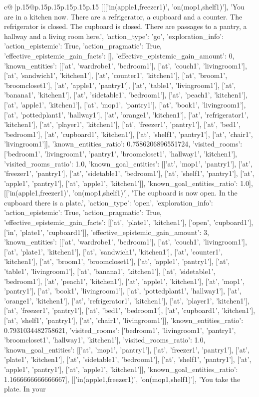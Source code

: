 \documentclass{article}
\begin{document}
{\begin{supertabular}{c@{$\;$}|p{.15\linewidth}@{}p{.15\linewidth}p{.15\linewidth}p{.15\linewidth}p{.15\linewidth}p{.15\linewidth}}
{{{	 [[['in(apple1,freezer1)', 'on(mop1,shelf1)'], 'You are in a kitchen now. There are a refrigerator, a cupboard and a counter. The refrigerator is closed. The cupboard is closed. There are passages to a pantry, a hallway and a living room here.', {'action_type': 'go', 'exploration_info': {'action_epistemic': True, 'action_pragmatic': True, 'effective_epistemic_gain_facts': [], 'effective_epistemic_gain_amount': 0, 'known_entities': [['at', 'wardrobe1', 'bedroom1'], ['at', 'couch1', 'livingroom1'], ['at', 'sandwich1', 'kitchen1'], ['at', 'counter1', 'kitchen1'], ['at', 'broom1', 'broomcloset1'], ['at', 'apple1', 'pantry1'], ['at', 'table1', 'livingroom1'], ['at', 'banana1', 'kitchen1'], ['at', 'sidetable1', 'bedroom1'], ['at', 'peach1', 'kitchen1'], ['at', 'apple1', 'kitchen1'], ['at', 'mop1', 'pantry1'], ['at', 'book1', 'livingroom1'], ['at', 'pottedplant1', 'hallway1'], ['at', 'orange1', 'kitchen1'], ['at', 'refrigerator1', 'kitchen1'], ['at', 'player1', 'kitchen1'], ['at', 'freezer1', 'pantry1'], ['at', 'bed1', 'bedroom1'], ['at', 'cupboard1', 'kitchen1'], ['at', 'shelf1', 'pantry1'], ['at', 'chair1', 'livingroom1']], 'known_entities_ratio': 0.7586206896551724, 'visited_rooms': ['bedroom1', 'livingroom1', 'pantry1', 'broomcloset1', 'hallway1', 'kitchen1'], 'visited_rooms_ratio': 1.0, 'known_goal_entities': [['at', 'mop1', 'pantry1'], ['at', 'freezer1', 'pantry1'], ['at', 'sidetable1', 'bedroom1'], ['at', 'shelf1', 'pantry1'], ['at', 'apple1', 'pantry1'], ['at', 'apple1', 'kitchen1']], 'known_goal_entities_ratio': 1.0}}], [['in(apple1,freezer1)', 'on(mop1,shelf1)'], 'The cupboard is now open. In the cupboard there is a plate.', {'action_type': 'open', 'exploration_info': {'action_epistemic': True, 'action_pragmatic': True, 'effective_epistemic_gain_facts': [['at', 'plate1', 'kitchen1'], ['open', 'cupboard1'], ['in', 'plate1', 'cupboard1']], 'effective_epistemic_gain_amount': 3, 'known_entities': [['at', 'wardrobe1', 'bedroom1'], ['at', 'couch1', 'livingroom1'], ['at', 'plate1', 'kitchen1'], ['at', 'sandwich1', 'kitchen1'], ['at', 'counter1', 'kitchen1'], ['at', 'broom1', 'broomcloset1'], ['at', 'apple1', 'pantry1'], ['at', 'table1', 'livingroom1'], ['at', 'banana1', 'kitchen1'], ['at', 'sidetable1', 'bedroom1'], ['at', 'peach1', 'kitchen1'], ['at', 'apple1', 'kitchen1'], ['at', 'mop1', 'pantry1'], ['at', 'book1', 'livingroom1'], ['at', 'pottedplant1', 'hallway1'], ['at', 'orange1', 'kitchen1'], ['at', 'refrigerator1', 'kitchen1'], ['at', 'player1', 'kitchen1'], ['at', 'freezer1', 'pantry1'], ['at', 'bed1', 'bedroom1'], ['at', 'cupboard1', 'kitchen1'], ['at', 'shelf1', 'pantry1'], ['at', 'chair1', 'livingroom1']], 'known_entities_ratio': 0.7931034482758621, 'visited_rooms': ['bedroom1', 'livingroom1', 'pantry1', 'broomcloset1', 'hallway1', 'kitchen1'], 'visited_rooms_ratio': 1.0, 'known_goal_entities': [['at', 'mop1', 'pantry1'], ['at', 'freezer1', 'pantry1'], ['at', 'plate1', 'kitchen1'], ['at', 'sidetable1', 'bedroom1'], ['at', 'shelf1', 'pantry1'], ['at', 'apple1', 'pantry1'], ['at', 'apple1', 'kitchen1']], 'known_goal_entities_ratio': 1.1666666666666667}}], [['in(apple1,freezer1)', 'on(mop1,shelf1)'], 'You take the plate. In your }}}
\end{supertabular}}
\end{document}
